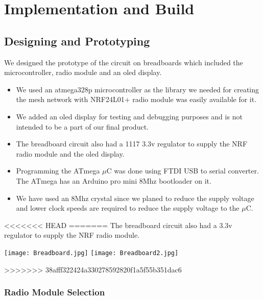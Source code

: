 \chapter{Implementation and Build}

\section{Designing and Prototyping}
We designed the prototype of the circuit on breadboards which included the microcontroller, radio module and an oled display.

\begin{itemize}
	\item We used an atmega328p microcontroller as the library we needed for creating the mesh network with NRF24L01+ radio module was easily available for it.
	
	\item We added an oled display for testing and debugging purposes and is not intended to be a part of our final product.

	\item The breadboard circuit also had a 1117 3.3v regulator to supply the NRF radio module and the oled display.
	
	\item Programming the ATmega $\mu$C was done using FTDI USB to serial converter. The ATmega has an Arduino pro mini 8Mhz bootloader on it.
	
	\item We have used an 8Mhz crystal since we planed to reduce the supply voltage and lower clock speeds are required to reduce the supply voltage to the $\mu$C.
	
\end{itemize}	

<<<<<<< HEAD
\vspace{20pt}
=======
The breadboard circuit also had a 3.3v regulator to supply the NRF radio module. 
\begin{center}
	\texttt{[image: Breadboard.jpg]}
	\texttt{[image: Breadboard2.jpg]}
\end{center}
>>>>>>> 38afff322424a330278592820f1a5f55b351dac6


\pagebreak

\subsection{Radio Module Selection}

